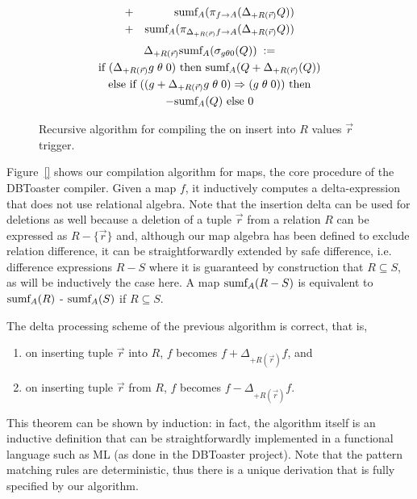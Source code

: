 \begin{figure}[t!]
\begin{eqnarray*}
   &+& \mbox{sumf}_A(\pi_{f \rightarrow A}(\Delta_{+R(\vec{r})} Q)) \\
   &+& \mbox{sumf}_A(\pi_{\Delta_{+R(\vec{r})} f \rightarrow A}(\Delta_{+R(\vec{r})} Q))
\end{eqnarray*}
\begin{multline*}
\Delta_{+R(\vec{r})} \mbox{sumf}_A(\sigma_{g \theta 0}(Q)) \; := \\
\mbox{if ($\Delta_{+R(\vec{r})} g \;\theta\; 0$) then
   $\mbox{sumf}_A(Q + \Delta_{+R(\vec{r})}(Q))$} \\
\mbox{else if ($(g + \Delta_{+R(\vec{r})} g \;\theta\; 0) \Rightarrow
(g \;\theta\; 0)$) then} \\
   \mbox{$- \mbox{sumf}_A(Q)$ else 0}
\end{multline*}
\caption{Recursive algorithm for compiling the
on insert into $R$ values $\vec{r}$ trigger.}
\end{figure}


Figure~\ref{} shows our compilation algorithm for maps, the core procedure of the DBToaster compiler.
Given a map $f$, it inductively
computes a delta-expression that does not use relational algebra.
Note that the insertion delta can be used for deletions as well because a deletion of
a tuple $\vec{r}$ from a relation $R$ can be expressed as $R - \{\vec{r}\}$ and,
although our map algebra has been defined to exclude relation difference,
it can be straightforwardly extended by safe difference, i.e. difference expressions
$R-S$ where it is guaranteed by construction that $R \subseteq S$, as will be inductively the case here. A map $\mbox{sumf}_A(R - S)$ is equivalent to
$\mbox{sumf}_A(R)$ - $\mbox{sumf}_A(S)$ if $R \subseteq S$.



\begin{theorem}
The delta processing scheme of the previous algorithm is correct,
that is,
\begin{enumerate}
\item
on inserting tuple $\vec{r}$ into $R$, $f$ becomes
$f + \Delta_{+R(\vec{r})} f$, and

\item
on inserting tuple $\vec{r}$ from $R$, $f$ becomes
$f - \Delta_{+R(\vec{r})} f$.
\end{enumerate}
\end{theorem}


This theorem can be shown by induction: in fact, the algorithm itself is an inductive
definition that can be straightforwardly implemented in a functional language such as
ML (as done in the DBToaster project). Note that the pattern matching rules are
deterministic, thus there is a unique derivation that is fully specified by our
algorithm.



